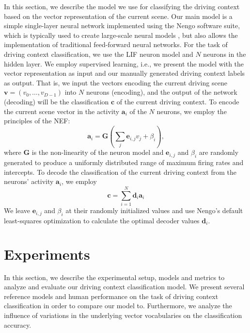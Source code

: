 In this section, we describe the model we use for classifying the driving context based on the vector representation of the current scene.
Our main model is a simple single-layer neural network implemented using the \ac{Nengo} \parencite{Bekolay2014} software suite, which is typically used to create large-scale neural models \parencite{Eliasmith2013}, but also allows the implementation of traditional feed-forward neural networks.
For the task of driving context classification, we use the \ac{LIF} neuron model and $N$ neurons in the hidden layer.
We employ supervised learning, i.e., we present the model with the vector representation as input and our manually generated driving context labels as output.
That is, we input the vectors encoding the current driving scene $\mathbf{v} = \left(v_{0}, \ldots, v_{D-1}\right)$ into $N$ neurons (encoding), and the output of the network (decoding) will be the classification $\mathbf{c}$ of the current driving context.
To encode the current scene vector in the activity $ \mathbf{a}_{i}$ of the $N$ neurons, we employ the principles of the \ac{NEF}:
\begin{equation}
  \mathbf{a}_{i} = \mathbf{G} \left(\sum_{j} \mathbf{e}_{i,j} v_j+\beta_i\right),
  \label{eq:context_class_encoding}
\end{equation}
where $ \mathbf{G}$ is the non-linearity of the neuron model and $\mathbf{e}_{i,j}$ and $\beta_i$ are randomly generated to produce a uniformly distributed range of maximum firing rates and intercepts.
To decode the classification of the current driving context from the neurons' activity $ \mathbf{a}_{i}$, we employ
\begin{equation}
    \mathbf{c} = \sum_{i=1}^{N} \mathbf{d}_{i}\mathbf{a}_i
  \label{eq:context_class_decoding}
\end{equation}
We leave $\mathbf{e}_{i,j}$ and $\beta_i$ at their randomly initialized values and use \ac{Nengo}'s default least-squares optimization to calculate the optimal decoder values $ \mathbf{d}_{i}$.

\section{Experiments}%
\label{sec:experiments_context_classificaiton}

In this section, we describe the experimental setup, models and metrics to analyze and evaluate our driving context classification model.
We present several reference models and human performance on the task of driving context classification in order to compare our model to.
Furthermore, we analyze the influence of variations in the underlying vector vocabularies on the classification accuracy.

